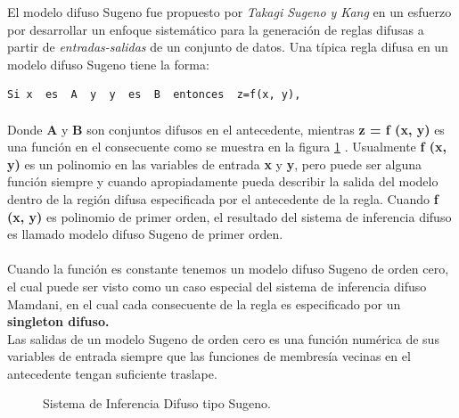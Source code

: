 \documentclass[12pt,letterpaper,oneside] {memoir}
\begin{document}
El modelo difuso Sugeno fue propuesto por \textit{Takagi Sugeno y Kang} en un esfuerzo por desarrollar un enfoque sistemático para la generación de reglas difusas a partir de \textit{entradas-salidas} de un conjunto de datos. Una típica regla difusa en un modelo difuso Sugeno tiene la forma:
\begin{verbatim}
Si x  es  A  y  y  es  B  entonces  z=f(x, y),
\end{verbatim}
\paragraph{}
Donde \textbf{A} y \textbf{B} son conjuntos difusos en el antecedente,  mientras \textbf{z = f (x, y)} es una función en el consecuente como se muestra en la figura \ref{fig:fuzzy33} \citep{Jang1997}. Usualmente \textbf{f (x, y)} es un polinomio en las variables de entrada \textbf{x} y \textbf{y}, pero puede ser alguna función siempre y cuando apropiadamente pueda  describir  la salida del modelo dentro de la región difusa especificada por el antecedente de la regla. Cuando \textbf{f (x, y)} es polinomio de primer orden,  el resultado del sistema de inferencia difuso es llamado modelo difuso Sugeno de primer orden.
\paragraph{}
Cuando la función es constante tenemos un modelo difuso Sugeno de orden cero, el cual puede ser visto como un caso especial del sistema de inferencia difuso Mamdani, en el cual cada consecuente de la regla es especificado por un \textbf{singleton difuso.}\\
Las salidas de un modelo Sugeno de orden cero es una función numérica de sus variables de entrada siempre que las funciones de membresía vecinas en el antecedente tengan suficiente traslape.\\

\begin{figure}[H] 
 \centering 
{} \caption{Sistema de Inferencia Difuso tipo Sugeno.} 
 \label{fig:fuzzy33} 
\end{figure}
\end{document}
